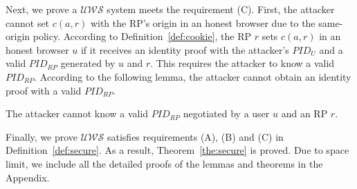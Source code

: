 
Next, we prove a $\mathcal{UWS}$ system meets the requirement (C). First, the attacker cannot set $c(a,r)$ with the RP's origin in an honest browser due to the same-origin policy. According to Definition~\ref{def:cookie}, the RP $r$ sets $c(a,r)$ in an honest browser $u$ if it receives an identity proof with the attacker's $PID_U$ and a valid $PID_{RP}$ generated by $u$ and $r$. This requires the attacker to know a valid $PID_{RP}$. According to the following lemma, the attacker cannot obtain an identity proof with a valid $PID_{RP}$.
\begin{lemma}
The attacker cannot know a valid $PID_{RP}$ negotiated by a user $u$ and an RP $r$.
\end{lemma}
\vspace{-\topsep}

Finally, we prove $\mathcal{UWS}$ satisfies requirements (A), (B) and (C) in Definition~\ref{def:secure}. As a result, Theorem~\ref{the:secure} is proved.  Due to space limit, we include all the detailed proofs of the lemmas and theorems in the Appendix.

